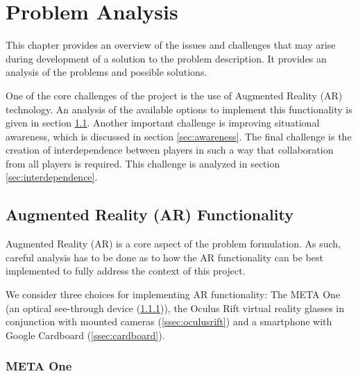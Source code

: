 \chapter{Problem Analysis} \label{cha:analysis}
	This chapter provides an overview of the issues and challenges that may
	arise during development of a solution to the problem description. It
	provides an analysis of the problems and possible solutions.

	One of the core challenges of the project is the use of Augmented Reality
	(AR) technology. An analysis of the available options to implement this
	functionality is given in section \ref{sec:ar}. Another important challenge
	is improving situational awareness, which is discussed in section
	\ref{sec:awareness}. The final challenge is the creation of interdependence
	between players in such a way that collaboration from all players is
	required. This challenge is analyzed in section \ref{sec:interdependence}.

	\section{Augmented Reality (AR) Functionality} \label{sec:ar}
		Augmented Reality (AR) is a core aspect of the problem formulation.
		As such, careful analysis has to be done as to how the AR functionality
		can be best implemented to fully address the context of this project.

		We consider three choices for implementing AR functionality: The META
		One (an optical see-through device (\ref{ssec:metaone})), the Oculus
		Rift virtual reality glasses in conjunction with mounted cameras
		(\ref{ssec:oculusrift}) and a smartphone with Google Cardboard
		(\ref{ssec:cardboard}).

		\subsection{META One} \label{ssec:metaone}

